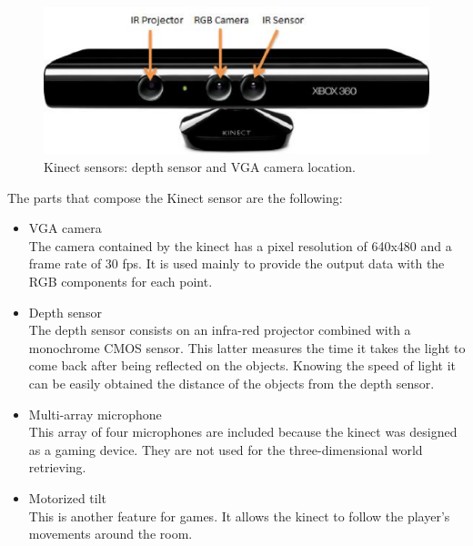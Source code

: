 		\begin{figure}[h]
			\begin{center}
		\includegraphics[scale=0.5]{img/kinect/kinect2.eps}
			\caption[Kinect Sensors]{Kinect sensors: depth sensor and VGA camera location.}
			\end{center}
		\end{figure}


		The parts that compose the Kinect sensor are the following: 

		\begin{itemize}
			\item{VGA camera}\\
			The camera contained by the kinect has a pixel resolution of 640x480 and a frame rate of 30 fps. It is used mainly to provide the output data with the RGB components for each point. 
			
			\item{Depth sensor}\\
			The depth sensor consists on an infra-red projector combined with a monochrome CMOS sensor. This latter measures the time it takes the light to come back after being reflected on the objects. Knowing the speed of light it can be easily obtained the distance of the objects from the depth sensor. 

			\item{Multi-array microphone}\\
			This array of four microphones are included because the kinect was designed as a gaming device. They are not used for the three-dimensional world retrieving. 
			
			\item{Motorized tilt}\\
			This is another feature for games. It allows the kinect to follow the player's movements around the room. \cite{howkinectworks}
		\end{itemize}



